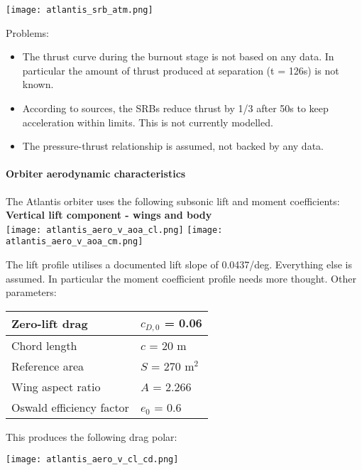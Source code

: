 \documentclass[Orbiter User Manual.tex]{subfiles}
\begin{document}
\texttt{[image: atlantis\_srb\_atm.png]}

\noindent
Problems:
\begin{itemize}
\item The thrust curve during the burnout stage is not based on any data. In particular the amount of thrust produced at separation (t = 126s) is not known.
\item According to sources, the SRBs reduce thrust by 1/3 after 50s to keep acceleration within limits. This is not currently modelled.
\item The pressure-thrust relationship is assumed, not backed by any data.
\end{itemize}

\paragraph{Orbiter aerodynamic characteristics}
The Atlantis orbiter uses the following subsonic lift and moment coefficients:\\

\textbf{\large Vertical lift component - wings and body}\\

\texttt{[image: atlantis\_aero\_v\_aoa\_cl.png]}
\texttt{[image: atlantis\_aero\_v\_aoa\_cm.png]}

The lift profile utilises a documented lift slope of 0.0437/deg. Everything else is assumed. In particular the moment coefficient profile needs more thought. Other parameters:

\begin{table}[H]
\centering
\begin{tabular}{|l|l|}
\hline
Zero-lift drag & $c_{D,0}$ = 0.06 \\ \hline
Chord length & $c$ = 20 m \\ \hline
Reference area & $S$ = 270 m$^2$ \\ \hline
Wing aspect ratio & $A$ = 2.266 \\ \hline
Oswald efficiency factor & $e_0$ = 0.6 \\ \hline
\end{tabular}
\end{table}

\begin{center}
This produces the following drag polar:

\texttt{[image: atlantis\_aero\_v\_cl\_cd.png]}
\end{center}
\end{document}
